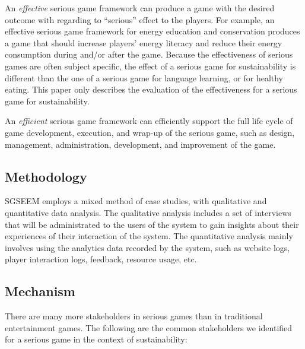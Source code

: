 \documentclass{sigchi}
\begin{document}
An \emph{effective} serious game framework can produce a game with the
desired outcome with regarding to ``serious'' effect to the players. For
example, an effective serious game framework for energy education and
conservation produces a game that should increase players' energy
literacy and reduce their energy consumption during and/or after the
game. Because the effectiveness of serious games are often subject
specific, the effect of a serious game for sustainability is different
than the one of a serious game for language learning, or for healthy
eating. This paper only describes the evaluation of the effectiveness
for a serious game for sustainability.

An \emph{efficient} serious game framework can efficiently support the
full life cycle of game development, execution, and wrap-up of the
serious game, such as design, management, administration, development,
and improvement of the game.

\subsection{Methodology}

SGSEEM employs a mixed method of case studies, with qualitative and
quantitative data analysis. The qualitative analysis includes a set of
interviews that will be administrated to the users of the system to
gain insights about their experiences of their interaction of the
system. The quantitative analysis mainly involves using the analytics
data recorded by the system, such as website logs, player interaction
logs, feedback, resource usage, etc.

\subsection{Mechanism}


There are many more stakeholders in serious
games than in traditional entertainment games. The following are the
common stakeholders we identified for a serious game in the context of
sustainability:
\end{document}
